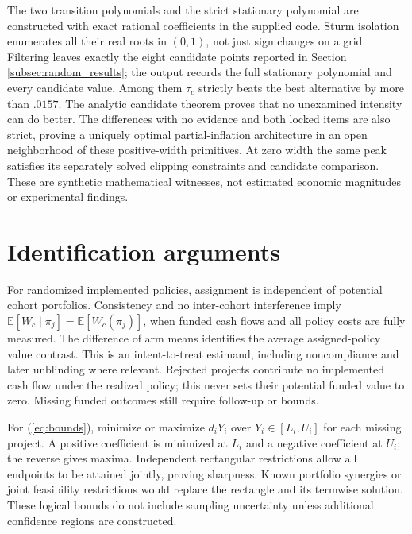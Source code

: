 \documentclass[11pt]{article}
\newcommand{\E}{\mathbb E}
\begin{document}
The two transition polynomials and the strict stationary polynomial are constructed with exact rational coefficients in the supplied code. Sturm isolation enumerates all their real roots in $(0,1)$, not just sign changes on a grid. Filtering leaves exactly the eight candidate points reported in Section \ref{subsec:random_results}; the output records the full stationary polynomial and every candidate value. Among them $\tau_c$ strictly beats the best alternative by more than $.0157$. The analytic candidate theorem proves that no unexamined intensity can do better. The differences with no evidence and both locked items are also strict, proving a uniquely optimal partial-inflation architecture in an open neighborhood of these positive-width primitives. At zero width the same peak satisfies its separately solved clipping constraints and candidate comparison. These are synthetic mathematical witnesses, not estimated economic magnitudes or experimental findings.

\section{Identification arguments}\label{app:identification}
For randomized implemented policies, assignment is independent of potential cohort portfolios. Consistency and no inter-cohort interference imply $\E[W_c\mid\pi_j]=\E[W_c(\pi_j)]$, when funded cash flows and all policy costs are fully measured. The difference of arm means identifies the average assigned-policy value contrast. This is an intent-to-treat estimand, including noncompliance and later unblinding where relevant. Rejected projects contribute no implemented cash flow under the realized policy; this never sets their potential funded value to zero. Missing funded outcomes still require follow-up or bounds.

For (\ref{eq:bounds}), minimize or maximize $d_iY_i$ over $Y_i\in[L_i,U_i]$ for each missing project. A positive coefficient is minimized at $L_i$ and a negative coefficient at $U_i$; the reverse gives maxima. Independent rectangular restrictions allow all endpoints to be attained jointly, proving sharpness. Known portfolio synergies or joint feasibility restrictions would replace the rectangle and its termwise solution. These logical bounds do not include sampling uncertainty unless additional confidence regions are constructed.
\end{document}
